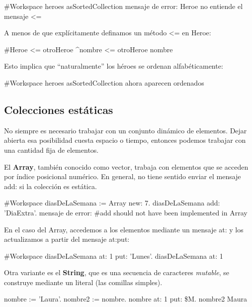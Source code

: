 \documentclass[a4paper,12pt]{book}
\begin{document}
\begin{code}
#Workspace
heroes asSortedCollection
  {mensaje de error: Heroe no entiende el mensaje <=}
\end{code}

A menos de que explícitamente definamos un método \textless= en Heroe:

\begin{code}
#Heroe
<= otroHeroe
   ^nombre <= otroHeroe nombre
\end{code}

Esto implica que ``naturalmente'' los héroes se ordenan alfabéticamente:

\begin{code}
#Workspace
heroes asSortedCollection
  {ahora aparecen ordenados}
\end{code}


\subsection{Colecciones estáticas}

No siempre es necesario trabajar con un conjunto dinámico de elementos. Dejar abierta esa posibilidad cuesta
espacio o tiempo, entonces podemos trabajar con una cantidad fija de elementos.

El \textbf{Array}, también conocido como vector, trabaja con elementos que se acceden por índice posicional
numérico.
\newline
\newline
En general, no tiene sentido enviar el mensaje add: si la colección es estática.

\begin{code}
#Workspace
diasDeLaSemana := Array new: 7.
diasDeLaSemana add: 'DiaExtra'.   
{mensaje de error: #add should not have been implemented in Array}
\end{code}

En el caso del Array, accedemos a los elementos mediante un mensaje at: y los actualizamos a partir del mensaje
at:put:

\begin{code}
#Workspace
diasDeLaSemana at: 1 put: 'Lunes'.
diasDeLaSemana at: 1
\end{code}

Otra variante es el \textbf{String}, que es una secuencia de caracteres \textit{mutable}, se construye
mediante un literal (las comillas simples).

\begin{code}
nombre := 'Laura'.
nombre2 := nombre.
nombre at: 1 put: \$M.
nombre2
    Maura
\end{code}
\end{document}
